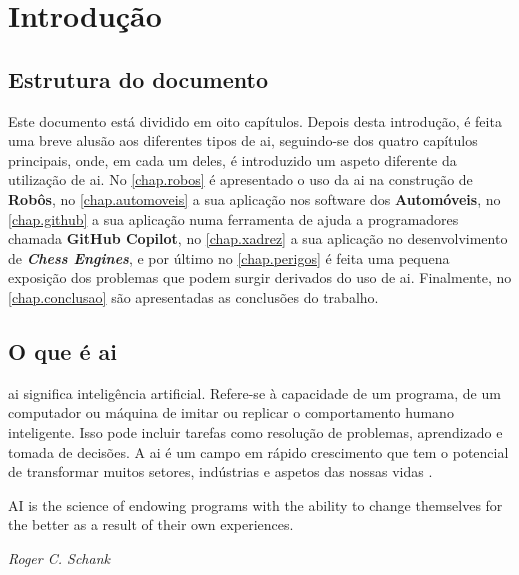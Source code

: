 \documentclass{report}
\begin{document}
\tableofcontents


\clearpage
{}


\chapter{Introdução}
\label{chap.introducao}
\section{Estrutura do documento}


Este documento está dividido em oito capítulos.
Depois desta introdução, é feita uma breve alusão aos diferentes tipos de \ac{ai}, seguindo-se dos quatro capítulos principais, onde, em cada um deles, é introduzido um aspeto diferente da utilização de \ac{ai}.
No \autoref{chap.robos} é apresentado o uso da \ac{ai} na construção de \textbf{Robôs},
no \autoref{chap.automoveis} a sua aplicação nos software dos \textbf{Automóveis}, no \autoref{chap.github} a sua aplicação numa ferramenta de ajuda a programadores chamada \textbf{GitHub Copilot}, no \autoref{chap.xadrez} a sua aplicação no desenvolvimento de \textbf{\textit{Chess Engines}}, e por último no \autoref{chap.perigos} é feita uma pequena exposição dos problemas que podem surgir derivados do uso de \ac{ai}.
Finalmente, no \autoref{chap.conclusao} são apresentadas as conclusões do trabalho.


\section{O que é \ac{ai}}

\ac{ai} significa inteligência artificial. Refere-se à capacidade de um programa, de um computador ou máquina de imitar ou replicar o comportamento humano inteligente. Isso pode incluir tarefas como resolução de problemas, aprendizado e tomada de decisões. A \ac{ai} é um campo em rápido crescimento que tem o potencial de transformar muitos setores, indústrias e aspetos das nossas vidas \cite{paper1}.


\epigraph{AI is the science of endowing programs with the ability to change themselves for the better as a result of their own experiences. }{\textit{Roger C. Schank}}
\end{document}
